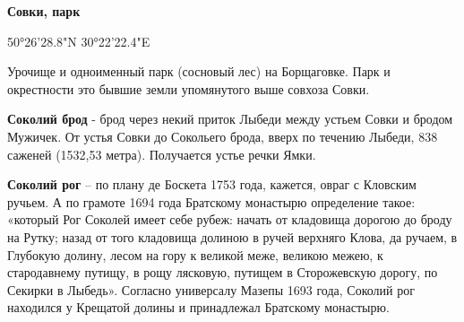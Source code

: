 \medskip

\textbf{Совки, парк}

50°26'28.8"N 30°22'22.4"E

Урочище и одноименный парк (сосновый лес) на Борщаговке. Парк и окрестности это бывшие земли упомянутого выше совхоза Совки.

\medskip





\textbf{Соколий брод} - брод через некий приток Лыбеди между устьем Совки и бродом Мужичек. От устья Совки до Сокольего брода, вверх по течению Лыбеди, 838 саженей (1532,53 метра). Получается устье речки Ямки.\\

\medskip

\textbf{Соколий рог} – по плану де Боскета 1753 года, кажется, овраг с Кловским ручьем. А по грамоте 1694 года Братскому монастырю определение такое: «который Рог Соколей имеет себе рубеж: начать от кладовища дорогою до броду на Рутку; назад от того кладовища долиною в ручей верхняго Клова, да ручаем, в Глубокую долину, лесом на гору к великой меже, великою межею, к стародавнему путищу, в рощу лясковую, путищем в Сторожевскую дорогу, по Секирки в Лыбедь». Согласно универсалу Мазепы 1693 года, Соколий рог находился у Крещатой долины и принадлежал Братскому монастырю.\\

\medskip

